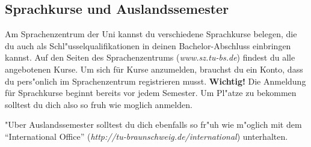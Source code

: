 \subsection{Sprachkurse und Auslandssemester}
Am Sprachenzentrum der Uni kannst du verschiedene Sprachkurse belegen, die du auch als Schl"usselqualifikationen in deinen Bachelor-Abschluss einbringen kannst.
Auf den Seiten des Sprachenzentrums (\emph{www.sz.tu-bs.de}) findest du alle angebotenen Kurse.
Um sich für Kurse anzumelden, brauchst du ein Konto, dass du pers"onlich im Sprachenzentrum registrieren musst.
\textbf{Wichtig!} Die Anmeldung für Sprachkurse beginnt bereits vor jedem Semester.
Um Pl"atze zu bekommen solltest du dich also so fruh wie moglich anmelden.

"Uber Auslandssemester solltest du dich ebenfalls so fr"uh wie m"oglich mit dem "`International Office"' (\emph{http://tu-braunschweig.de/international}) unterhalten.
